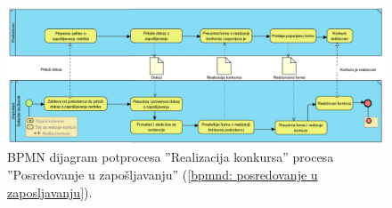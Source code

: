 \begin{mylandscape}
	\newpage
	
	\begin{figure}[H]
		\centering
		\includegraphics[width=0.7\paperwidth]{dijagrami/bpmn-dijagrami/bpmn-10.png}
		\caption{BPMN dijagram potprocesa ''Realizacija konkursa'' procesa ''Posredovanje u zapo\v sljavanju'' (\ref{bpmnd: posredovanje u zaposljavanju}).}
	\end{figure}
	
\end{mylandscape}